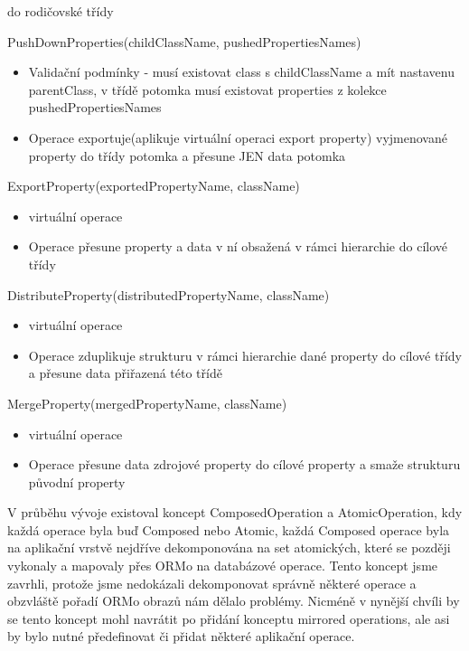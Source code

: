\documentclass[11pt,twoside,a4paper]{book}
\begin{document}
\begin{list}{Operace :}{}
\begin{itemize}
    do rodičovské třídy
  \end{itemize}
  \item PushDownProperties(childClassName, pushedPropertiesNames)
  \begin{itemize}
    \item Validační podmínky - musí existovat class s childClassName a mít
    nastavenu parentClass, v třídě potomka musí existovat properties z kolekce
    pushedPropertiesNames
    \item Operace exportuje(aplikuje virtuální operaci export property) 
   vyjmenované property do třídy potomka a přesune JEN data potomka
  \end{itemize}
  \item ExportProperty(exportedPropertyName, className)
  \begin{itemize}
    \item virtuální operace
    \item Operace přesune property a data v ní obsažená v rámci hierarchie do
    cílové třídy
  \end{itemize}
  \item DistributeProperty(distributedPropertyName, className)
  \begin{itemize}
    \item virtuální operace
    \item Operace zduplikuje strukturu v rámci hierarchie dané property do
    cílové třídy a přesune data přiřazená této třídě
  \end{itemize}
  \item MergeProperty(mergedPropertyName, className)
  \begin{itemize}
    \item virtuální operace
    \item Operace přesune data zdrojové property do cílové property a smaže
    strukturu původní property
  \end{itemize}
\end{list}

V průběhu vývoje existoval koncept ComposedOperation a AtomicOperation, kdy
každá operace byla buď Composed nebo Atomic, každá Composed operace byla na
aplikační vrstvě nejdříve dekomponována na set atomických, které se později
vykonaly a mapovaly přes ORMo na databázové operace. Tento koncept jsme zavrhli,
protože jsme nedokázali dekomponovat správně některé operace a obzvláště
pořadí ORMo obrazů nám dělalo problémy. Nicméně v nynější chvíli by se tento
koncept mohl navrátit po přidání konceptu mirrored operations, ale asi by bylo
nutné předefinovat či přidat některé aplikační operace.
\end{document}
